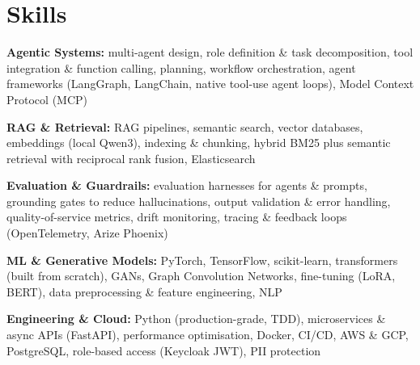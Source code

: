 \documentclass[10pt,a4paper]{article}
\begin{document}
\section{Skills}
\begin{tight}
  \item[\textcolor{accent}{\small$\bullet$}] \textbf{Agentic Systems:} multi-agent design, role definition \& task decomposition, tool integration \& function calling, planning, workflow orchestration, agent frameworks (LangGraph, LangChain, native tool-use agent loops), Model Context Protocol (MCP)
  \item[\textcolor{accent}{\small$\bullet$}] \textbf{RAG \& Retrieval:} RAG pipelines, semantic search, vector databases, embeddings (local Qwen3), indexing \& chunking, hybrid BM25 plus semantic retrieval with reciprocal rank fusion, Elasticsearch
  \item[\textcolor{accent}{\small$\bullet$}] \textbf{Evaluation \& Guardrails:} evaluation harnesses for agents \& prompts, grounding gates to reduce hallucinations, output validation \& error handling, quality-of-service metrics, drift monitoring, tracing \& feedback loops (OpenTelemetry, Arize Phoenix)
  \item[\textcolor{accent}{\small$\bullet$}] \textbf{ML \& Generative Models:} PyTorch, TensorFlow, scikit-learn, transformers (built from scratch), GANs, Graph Convolution Networks, fine-tuning (LoRA, BERT), data preprocessing \& feature engineering, NLP
  \item[\textcolor{accent}{\small$\bullet$}] \textbf{Engineering \& Cloud:} Python (production-grade, TDD), microservices \& async APIs (FastAPI), performance optimisation, Docker, CI/CD, AWS \& GCP, PostgreSQL, role-based access (Keycloak JWT), PII protection
\end{tight}

\end{document}
